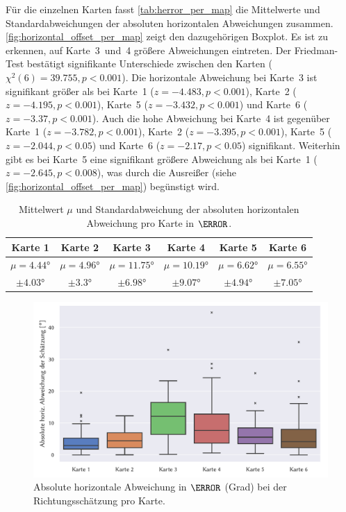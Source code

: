Für die einzelnen Karten fasst \autoref{tab:herror_per_map} die Mittelwerte und Standardabweichungen der absoluten horizontalen Abweichungen zusammen.
\autoref{fig:horizontal_offset_per_map} zeigt den dazugehörigen Boxplot.
Es ist zu erkennen, auf Karte~3~und~4 größere Abweichungen eintreten.
Der Friedman-Test bestätigt signifikante Unterschiede zwischen den Karten ($\chi^2(6) = \num{39.755}, p < \num{0.001}$).
Die horizontale Abweichung bei Karte~3 ist signifikant größer als bei Karte~1 ($z = \num{-4,483}, p < \num{0,001}$), Karte~2 ($z = \num{-4,195}, p < \num{0,001}$), Karte~5 ($z = \num{-3,432}, p < \num{0,001}$) und Karte~6 ($z = \num{-3,37}, p < \num{0,001}$).
Auch die hohe Abweichung bei Karte~4 ist gegenüber Karte~1 ($z = \num{-3,782}, p < \num{0,001}$), Karte~2 ($z = \num{-3,395}, p < \num{0,001}$), Karte~5 ($z = \num{-2,044}, p < \num{0,05}$) und Karte~6 ($z = \num{-2,17}, p < \num{0,05}$) signifikant.
Weiterhin gibt es bei Karte~5 eine signifikant größere Abweichung als bei Karte~1 ($z = \num{-2,645}, p < \num{0,008}$), was durch die Ausreißer (siehe \autoref{fig:horizontal_offset_per_map}) begünstigt wird.
\begin{table}[h]
    \centering
    \caption{Mittelwert $\mu$ und Standardabweichung der absoluten horizontalen Abweichung pro Karte in $\degree$.}
    \label{tab:herror_per_map}
    \begin{tabular}{cccccc}\toprule
        Karte 1 & Karte 2 & Karte 3 & Karte 4 & Karte 5 & Karte 6 \\\midrule
        $\mu = \ang{4,44}$ & $\mu = \ang{4,96}$ & $\mu = \ang{11,75}$ & $\mu = \ang{10,19}$ & $\mu = \ang{6,62}$ & $\mu = \ang{6,55}$ \\
        $\pm \ang{4,03}$ & $\pm \ang{3,3}$ & $\pm \ang{6,98}$ & $\pm \ang{9,07}$ & $\pm \ang{4,94}$ & $\pm \ang{7,05}$ \\\bottomrule
    \end{tabular}
\end{table}
\begin{figure}[h]
    \centering
    \includegraphics[trim={0cm, 0cm, 0.65cm, 0cm}, clip, width=\linewidth]{figures/analysis/horizontal_offset_per_map}
    \caption{Absolute horizontale Abweichung in $\degree$ (Grad) bei der Richtungsschätzung pro Karte.}
    \label{fig:horizontal_offset_per_map}
\end{figure}%

